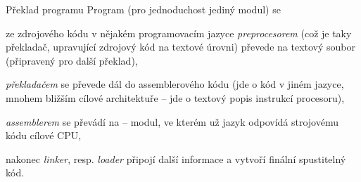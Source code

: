 \begin{obecne}{Překlad programu}
Program (pro jednoduchost jediný modul) se 
\begin{penumerate}
    \item ze zdrojového kódu v nějakém programovacím jazyce \emph{preprocesorem} (což je taky překladač, upravující zdrojový kód na textové úrovni) převede na textový soubor (připravený pro další překlad),
    \item \emph{překladačem} se převede dál do assemblerového kódu (jde o kód v jiném jazyce, mnohem bližším cílové architektuře -- jde o textový popis instrukcí procesoru),
    \item \emph{assemblerem} se převádí na  -- modul, ve kterém už jazyk odpovídá strojovému kódu cílové CPU,
    \item nakonec \emph{linker}, resp. \emph{loader} připojí další informace a vytvoří finální spustitelný kód.
\end{penumerate}
\end{obecne}

